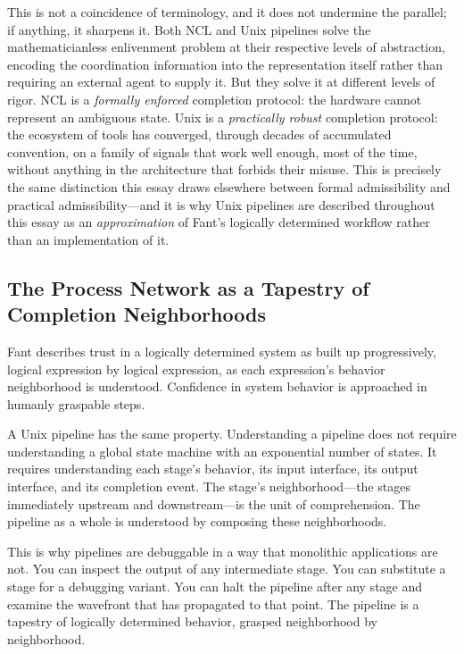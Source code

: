 \documentclass[12pt, a4paper]{article}
\begin{document}
This is not a coincidence of terminology, and it does not
undermine the parallel; if anything, it sharpens it. Both NCL and
Unix pipelines solve the mathematicianless enlivenment problem at
their respective levels of abstraction, encoding the coordination
information into the representation itself rather than requiring
an external agent to supply it. But they solve it at different
levels of rigor. NCL is a \emph{formally enforced} completion
protocol: the hardware cannot represent an ambiguous state. Unix
is a \emph{practically robust} completion protocol: the ecosystem
of tools has converged, through decades of accumulated
convention, on a family of signals that work well enough, most of
the time, without anything in the architecture that forbids their
misuse. This is precisely the same distinction this essay draws
elsewhere between formal admissibility and practical
admissibility---and it is why Unix pipelines are described
throughout this essay as an \emph{approximation} of Fant's
logically determined workflow rather than an implementation of
it.

\subsection{The Process Network as a Tapestry of Completion Neighborhoods}

Fant describes trust in a logically determined system as built up
progressively, logical expression by logical expression, as each
expression's behavior neighborhood is understood. Confidence in
system behavior is approached in humanly graspable steps.

A Unix pipeline has the same property. Understanding a pipeline does
not require understanding a global state machine with an exponential
number of states. It requires understanding each stage's behavior, its
input interface, its output interface, and its completion event. The
stage's neighborhood---the stages immediately upstream and
downstream---is the unit of comprehension. The pipeline as a whole is
understood by composing these neighborhoods.

This is why pipelines are debuggable in a way that monolithic
applications are not. You can inspect the output of any intermediate
stage. You can substitute a stage for a debugging variant. You can
halt the pipeline after any stage and examine the wavefront that has
propagated to that point. The pipeline is a tapestry of logically
determined behavior, grasped neighborhood by neighborhood.
\end{document}
